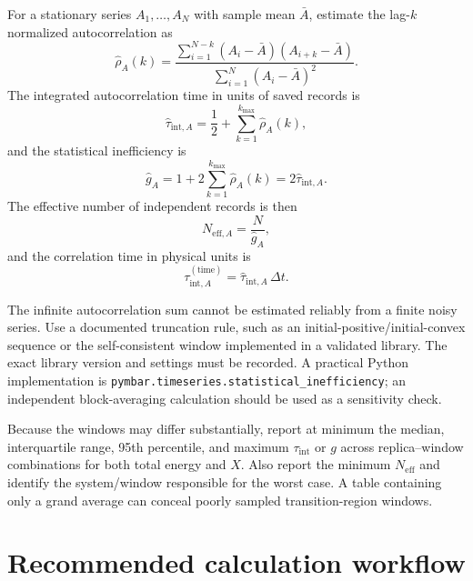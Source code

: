 \documentclass[11pt,a4paper]{article}
\begin{document}
For a stationary series $A_1,\ldots,A_N$ with sample mean $\bar A$, estimate the lag-$k$ normalized autocorrelation as
\begin{equation}
  \widehat{\rho}_A(k)=
  \frac{\sum_{i=1}^{N-k}(A_i-\bar A)(A_{i+k}-\bar A)}
       {\sum_{i=1}^{N}(A_i-\bar A)^2}.
\end{equation}
The integrated autocorrelation time in units of saved records is
\begin{equation}
  \widehat{\tau}_{\mathrm{int},A}
  =\frac{1}{2}+\sum_{k=1}^{k_{\max}}\widehat{\rho}_A(k),
\end{equation}
and the statistical inefficiency is
\begin{equation}
  \widehat{g}_A=1+2\sum_{k=1}^{k_{\max}}\widehat{\rho}_A(k)
  =2\widehat{\tau}_{\mathrm{int},A}.
\end{equation}
The effective number of independent records is then
\begin{equation}
  N_{\mathrm{eff},A}=\frac{N}{\widehat{g}_A},
\end{equation}
and the correlation time in physical units is
\begin{equation}
  \tau_{\mathrm{int},A}^{(\mathrm{time})}
  =\widehat{\tau}_{\mathrm{int},A}\,\Delta t.
\end{equation}

The infinite autocorrelation sum cannot be estimated reliably from a finite noisy series. Use a documented truncation rule, such as an initial-positive/initial-convex sequence or the self-consistent window implemented in a validated library. The exact library version and settings must be recorded. A practical Python implementation is \texttt{pymbar.timeseries.statistical\_inefficiency}; an independent block-averaging calculation should be used as a sensitivity check.

Because the windows may differ substantially, report at minimum the median, interquartile range, 95th percentile, and maximum $\tau_{\mathrm{int}}$ or $g$ across replica--window combinations for both total energy and $X$. Also report the minimum $N_{\mathrm{eff}}$ and identify the system/window responsible for the worst case. A table containing only a grand average can conceal poorly sampled transition-region windows.

\section{Recommended calculation workflow}
\end{document}
